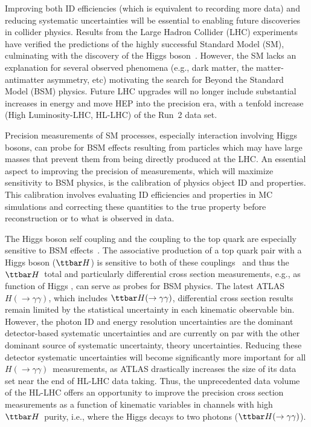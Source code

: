 \documentclass[letter, USenglish, 11pt, subfigure]{article}
\newcommand{\tth}{\ensuremath{\ttbar H}}
\newcommand{\tthyy}{\ensuremath{\ttbar H(\to\gamma\gamma)}}
\newcommand{\hyy}{\ensuremath{H(\to\gamma\gamma)}}
\begin{document}
Improving both ID efficiencies (which is equivalent to recording more data) and reducing systematic uncertainties will be essential to enabling future discoveries in collider physics. Results from the Large Hadron Collider (LHC) experiments have verified the predictions of the highly successful Standard Model (SM), culminating with the discovery of the Higgs boson~\cite{HIGG-2012-27,CMS-HIG-12-028}. However, the SM  lacks an explanation for several observed phenomena (e.g., dark matter, the matter-antimatter asymmetry, etc) motivating the search for Beyond the Standard Model (BSM) physics. Future LHC upgrades will no longer include substantial increases in energy and move HEP into the precision era, with a tenfold increase (High Luminosity-LHC, HL-LHC) of the Run~2 data set. 

Precision measurements of SM processes, especially interaction involving Higgs bosons, can probe for BSM effects resulting from particles which may have large masses that prevent them from being directly produced at the LHC. An essential aspect to improving the precision of measurements, which will maximize sensitivity to BSM physics, is the calibration of physics object ID and properties. This calibration involves evaluating ID efficiencies and properties in MC simulations and correcting these quantities to the true property before reconstruction or to what is observed in data. 

The Higgs boson self coupling and the coupling to the top quark are especially sensitive to BSM effects~\cite{Agrawal_2020}. The associative production of a top quark pair with a Higgs boson (\tth) is sensitive to both of these couplings~\cite{Maltoni_2017} and thus the \tth\ total and particularly differential cross section measurements, e.g., as function of Higgs \pt, can serve as probes for BSM physics. The latest ATLAS \hyy, which includes \tthyy, differential cross section results~\cite{ATLAS_STXS} remain limited by the statistical uncertainty in each kinematic observable bin. However, the photon ID and energy resolution uncertainties are the dominant detector-based systematic uncertainties and are currently on par with the other dominant source of systematic uncertainty, theory uncertainties. Reducing these detector systematic uncertainties will become significantly more important for all \hyy\ measurements, as ATLAS drastically increases the size of its data set near the end of HL-LHC data taking. Thus, the unprecedented data volume of the HL-LHC offers an opportunity to improve the precision cross section measurements as a function of kinematic variables in channels with high \tth\ purity, i.e., where the Higgs decays to two photons (\tthyy).
\end{document}
